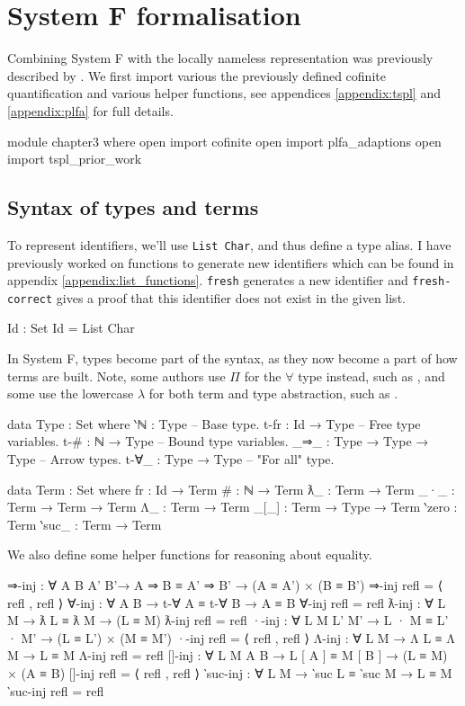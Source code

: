 \documentclass[logo,bsc,singlespacing,parskip,online]{infthesis}
\begin{document}
\chapter{System F formalisation}
\label{chapter3}
Combining System F with the locally nameless representation was previously described by
\citet{chargueraud_locally_2012}. We first import various the previously defined cofinite
quantification and various helper functions, see appendices \ref{appendix:tspl} and
\ref{appendix:plfa} for full details.
\begin{code}
module chapter3 where
  open import cofinite
  open import plfa_adaptions
  open import tspl_prior_work
\end{code}

\section{Syntax of types and terms}
To represent identifiers, we'll use \texttt{List Char}, and thus define a type alias. I have
previously worked on functions to generate new identifiers which can be found in appendix
\ref{appendix:list_functions}. \texttt{fresh} generates a new identifier and \texttt{fresh-correct}
gives a proof that this identifier does not exist in the given list.
\begin{code}
  Id : Set
  Id = List Char
\end{code}

In System F, types become part of the syntax, as they now become a part of how terms are built.
Note, some authors use $\Pi$ for the $\forall$ type instead, such as \citet{hutton_system_2019}, and
some use the lowercase $\lambda$ for both term and type abstraction, such as
\citet{pierce_types_2002}.
\begin{code}
  data Type : Set where
    ‵ℕ      : Type                 -- Base type.
    t-fr     : Id → Type           -- Free type variables.
    t-#      : ℕ → Type            -- Bound type variables.
    _⇒_      : Type → Type → Type  -- Arrow types.
    t-∀_     : Type → Type         -- "For all" type.

  data Term : Set where
    fr     : Id → Term
    #      : ℕ → Term
    ƛ_     : Term → Term
    _·_    : Term → Term → Term
    Λ_     : Term → Term
    _[_]   : Term → Type → Term
    ‵zero  : Term
    ‵suc_  : Term → Term
\end{code}

We also define some helper functions for reasoning about equality.
\begin{code}
  ⇒-inj : ∀ {A B A' B'}→ A ⇒ B ≡ A' ⇒ B' → (A ≡ A') × (B ≡ B')
  ⇒-inj refl = ⟨ refl , refl ⟩
  ∀-inj : ∀ {A B} → t-∀ A ≡ t-∀ B → A ≡ B
  ∀-inj refl = refl
  ƛ-inj : ∀ {L M} → ƛ L ≡ ƛ M → (L ≡ M)
  ƛ-inj refl = refl
  ·-inj : ∀ {L M L' M'} → L · M ≡ L' · M' → (L ≡ L') × (M ≡ M')
  ·-inj refl = ⟨ refl , refl ⟩
  Λ-inj : ∀ {L M} → Λ L ≡ Λ M → L ≡ M
  Λ-inj refl = refl
  []-inj : ∀ {L M A B} → L [ A ] ≡ M [ B ] → (L ≡ M) × (A ≡ B)
  []-inj refl = ⟨ refl , refl ⟩
  ‵suc-inj : ∀ {L M} → ‵suc L ≡ ‵suc M → L ≡ M
  ‵suc-inj refl = refl
\end{code}
\end{document}
